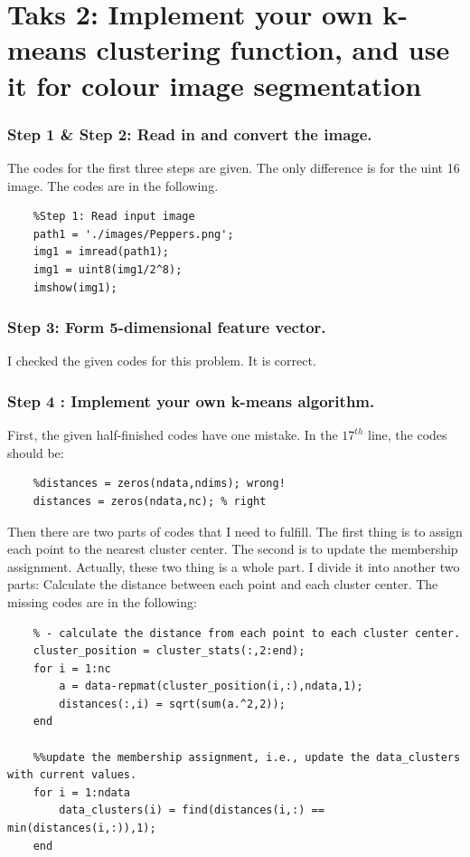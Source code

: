 \documentclass{article}
\begin{document}
\section*{Taks 2: Implement your own k-means clustering function, and use it for colour image segmentation}

\subsubsection*{Step 1 \& Step 2: Read in and convert the image.}

The codes for the first three steps are given. The only difference is for the uint 16 image. The codes are in the following.

\begin{lstlisting}
    %Step 1: Read input image
    path1 = './images/Peppers.png';
    img1 = imread(path1);
    img1 = uint8(img1/2^8);
    imshow(img1);
\end{lstlisting}

\subsubsection*{Step 3: Form 5-dimensional feature vector. }

I checked the given codes for this problem. It is correct.

\subsubsection*{Step 4 : Implement your own k-means algorithm.}

First, the given half-finished codes have one mistake. In the $17^{th}$ line, the codes should be:
\begin{lstlisting}
    %distances = zeros(ndata,ndims); wrong!
    distances = zeros(ndata,nc); % right
\end{lstlisting}

Then there are two parts of codes that I need to fulfill. The first thing is to assign each point to the nearest cluster center. The second is to update the membership assignment. Actually, these two thing is a whole part. I divide it into another two parts: Calculate the distance between each point and each cluster center. The missing codes are in the following:

\begin{lstlisting}
    % - calculate the distance from each point to each cluster center.  
    cluster_position = cluster_stats(:,2:end); 
    for i = 1:nc
        a = data-repmat(cluster_position(i,:),ndata,1);
        distances(:,i) = sqrt(sum(a.^2,2));
    end
    
	%%update the membership assignment, i.e., update the data_clusters with current values.  
    for i = 1:ndata
        data_clusters(i) = find(distances(i,:) == min(distances(i,:)),1);
    end
\end{lstlisting}
\end{document}
